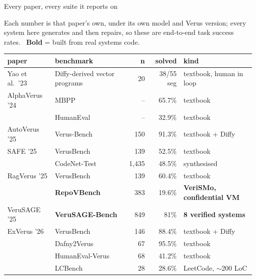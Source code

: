 \documentclass[aspectratio=169,10pt]{beamer}
\newcommand{\hd}[1]{\textbf{\color{lgTeal}#1}}
\newcommand{\good}[1]{{\color{lgGreen}#1}}
\begin{document}
\begin{frame}{Every paper, every suite it reports on}

{\scriptsize
{\color{lgGrey}Each number is that paper's own, under its own model and Verus version; every
system here generates and then repairs, so these are end-to-end task success rates.}
\ \hd{Bold} = built from real systems code.
}

\vspace{3pt}
\begin{center}
{\tiny
\renewcommand{\arraystretch}{0.88}
\setlength{\tabcolsep}{4pt}
\begin{tabular}{@{}llrrl@{}}
\toprule
\textbf{paper} & \textbf{benchmark} & \textbf{n} & \textbf{solved} & \textbf{kind} \\
\midrule
Yao et al.\ '23 & Diffy-derived vector programs & 20 & 38/55 seg & textbook, human in loop \\
\addlinespace[2pt]
AlphaVerus '24  & MBPP                    & --    & 65.7\% & textbook \\
                & HumanEval               & --    & 32.9\% & textbook \\
\addlinespace[2pt]
AutoVerus '25   & Verus-Bench             & 150   & \good{91.3\%} & textbook + Diffy \\
\addlinespace[2pt]
SAFE '25        & VerusBench              & 139   & 52.5\% & textbook \\
                & CodeNet-Test            & 1,435 & 48.5\% & synthesised \\
\addlinespace[2pt]
RagVerus '25    & VerusBench              & 139   & 60.4\% & textbook \\
                & \textbf{RepoVBench}     & 383   & 19.6\% & \textbf{VeriSMo, confidential VM} \\
\addlinespace[2pt]
VeruSAGE '25    & \textbf{VeruSAGE-Bench} & 849   & 81\%   & \textbf{8 verified systems} \\
\addlinespace[2pt]
ExVerus '26     & VerusBench              & 146   & 88.4\% & textbook + Diffy \\
                & Dafny2Verus             & 67    & \good{95.5\%} & textbook \\
                & HumanEval-Verus         & 68    & 41.2\% & textbook \\
                & LCBench                 & 28    & 28.6\% & LeetCode, $\sim$200 LoC \\

\end{tabular}}
\end{center}
\end{frame}
\end{document}
